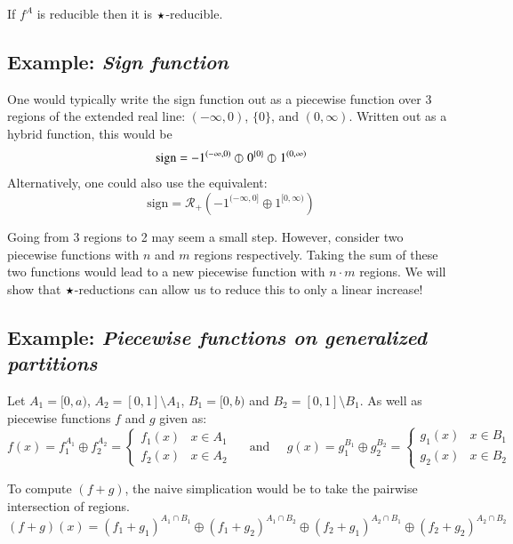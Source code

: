 If $f^A$ is reducible then it is $\star$-reducible.


\subsection{Example: \emph{Sign function}}

One would typically write the sign function out as a piecewise function over 3 regions of the extended real line: 
$(-\infty, 0)$, $\{ 0 \}$, and $(0, \infty)$.
Written out as a hybrid function, this would be
\begin{equation}
	\text{sign} = -1^{(-\infty, 0)} \varobar^{} 0^{\{0\}} \varobar^{} 1^{(0, \infty)}
\end{equation}
Alternatively, one could also use the equivalent:
\begin{equation}
	\text{sign} = \mathcal{R}_+ \left( -1^{(-\infty, 0]} \oplus 1^{[0, \infty)} \right)
\end{equation}

Going from 3 regions to 2 may seem a small step.
However, consider two piecewise functions with $n$ and $m$ regions respectively.
Taking the sum of these two functions would lead to a new piecewise function with $n\cdot m$ regions.
We will show that $\star$-reductions can allow us to reduce this to only a linear increase!


\subsection{Example: \emph{Piecewise functions on generalized partitions}} 
Let $A_1 = [0,a)$, $A_2 = [0,1] \setminus A_1$, $B_1 = [0,b)$ and $B_2 = [0,1] \setminus B_1$.
As well as piecewise functions $f$ and $g$ given as:
\begin{equation*}
	f(x) = f_1^{A_1} \oplus f_2^{A_2}
		= \begin{cases}
			f_1(x) & x \in A_1 \\
			f_2(x) & x \in A_2
		\end{cases}
	\;\;\;\;\; \text{and} \;\;\;\;\;
	g(x) = g_1^{B_1} \oplus g_2^{B_2}
		= \begin{cases}
			g_1(x) & x \in B_1 \\
			g_2(x) & x \in B_2
		\end{cases}
\end{equation*}

To compute $(f+g)$, the naive simplication would be to take the pairwise intersection of regions.
\begin{equation}
	(f+g)(x) = (f_1 + g_1)^{A_1 \cap B_1} 
		\oplus (f_1 + g_2)^{A_1 \cap B_2} 
		\oplus (f_2 + g_1)^{A_2 \cap B_1}
		\oplus (f_2 + g_2)^{A_2 \cap B_2}
\end{equation}

